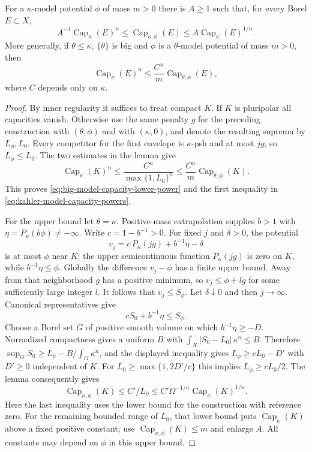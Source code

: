 \begin{proposition}\label{prop:kahler-model-capacity-powers}
For a $\kappa$-model potential $\phi$ of mass $m>0$ there is $A\geq1$ such that, for every Borel $E\subset X$,
\begin{equation}\label{eq:kahler-model-capacity-powers}
 A^{-1}\operatorname{Cap}_\kappa(E)^n
       \leq\operatorname{Cap}_{\kappa,\phi}(E)
       \leq A\operatorname{Cap}_\kappa(E)^{1/n}.
\end{equation}
More generally, if $\theta\leq\kappa$, $\{\theta\}$ is big and $\phi$ is a $\theta$-model potential of mass $m>0$, then
\begin{equation}\label{eq:big-model-capacity-lower-power}
 \operatorname{Cap}_\kappa(E)^n
                        \leq\frac{C^n}{m}\operatorname{Cap}_{\theta,\phi}(E),
\end{equation}
where $C$ depends only on $\kappa$.
\end{proposition}
\begin{proof}
By inner regularity it suffices to treat compact $K$. If $K$ is pluripolar all capacities vanish. Otherwise use the same penalty $g$ for the preceding construction with $(\theta,\phi)$ and with $(\kappa,0)$, and denote the resulting suprema by $L_\phi,L_0$. Every competitor for the first envelope is $\kappa$-psh and at most $jg$, so $L_\phi\leq L_0$. The two estimates in the lemma give
\[
 \operatorname{Cap}_\kappa(K)^n
    \leq\frac{C^n}{\max\{1,L_0\}^n}
    \leq\frac{C^n}{m}\operatorname{Cap}_{\theta,\phi}(K).
\]
This proves \eqref{eq:big-model-capacity-lower-power} and the first inequality in \eqref{eq:kahler-model-capacity-powers}.

For the upper bound let $\theta=\kappa$. Positive-mass extrapolation supplies $b>1$ with $\eta=P_\kappa(b\phi)\ne-\infty$. Write $c=1-b^{-1}>0$. For fixed $j$ and $\delta>0$, the potential
\[
 v_j=c\,P_\kappa(jg)+b^{-1}\eta-\delta
\]
is at most $\phi$ near $K$: the upper semicontinuous function $P_\kappa(jg)$ is zero on $K$, while $b^{-1}\eta\leq\phi$. Globally the difference $v_j-\phi$ has a finite upper bound. Away from that neighborhood $g$ has a positive minimum, so $v_j\leq\phi+lg$ for some sufficiently large integer $l$. It follows that $v_j\leq S_\phi$. Let $\delta\downarrow0$ and then $j\to\infty$. Canonical representatives give
\[
 cS_0+b^{-1}\eta\leq S_\phi.
\]
Choose a Borel set $G$ of positive smooth volume on which $b^{-1}\eta\geq-D$. Normalized compactness gives a uniform $B$ with $\int_X|S_0-L_0|\,\kappa^n\leq B$. Therefore
$\sup_GS_0\geq L_0-B/\int_G\kappa^n$, and the displayed inequality gives
$L_\phi\geq cL_0-D'$ with $D'\geq0$ independent of $K$. For $L_0\geq\max\{1,2D'/c\}$ this implies $L_\phi\geq cL_0/2$. The lemma consequently gives
\[
 \operatorname{Cap}_{\kappa,\phi}(K)\leq C'/L_0
       \leq C'\Omega^{-1/n}\operatorname{Cap}_\kappa(K)^{1/n}.
\]
Here the last inequality uses the lower bound for the construction with reference zero. For the remaining bounded range of $L_0$, that lower bound puts $\operatorname{Cap}_\kappa(K)$ above a fixed positive constant; use $\operatorname{Cap}_{\kappa,\phi}(K)\leq m$ and enlarge $A$. All constants may depend on $\phi$ in this upper bound.
\end{proof}

